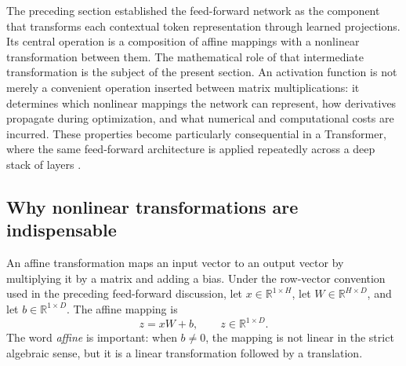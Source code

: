 
The preceding section established the feed-forward network as the component
that transforms each contextual token representation through learned
projections. Its central operation is a composition of affine mappings with
a nonlinear transformation between them. The mathematical role of that
intermediate transformation is the subject of the present section. An
activation function is not merely a convenient operation inserted between
matrix multiplications: it determines which nonlinear mappings the network
can represent, how derivatives propagate during optimization, and what
numerical and computational costs are incurred. These properties become
particularly consequential in a Transformer, where the same feed-forward
architecture is applied repeatedly across a deep stack of layers
\parencite{han2024review,zhuo2025polycom}.

\subsection{Why nonlinear transformations are indispensable}
\label{subsec:act-nonlinearity}

An affine transformation maps an input vector to an output vector by
multiplying it by a matrix and adding a bias. Under the row-vector convention
used in the preceding feed-forward discussion, let
\(x\in\mathbb{R}^{1\times H}\), let
\(W\in\mathbb{R}^{H\times D}\), and let
\(b\in\mathbb{R}^{1\times D}\). The affine mapping is
\begin{equation}
    z=xW+b,
    \qquad
    z\in\mathbb{R}^{1\times D}.
    \label{eq:act-affine-map}
\end{equation}
The word \emph{affine} is important: when \(b\neq 0\), the mapping is not
linear in the strict algebraic sense, but it is a linear transformation
followed by a translation.

